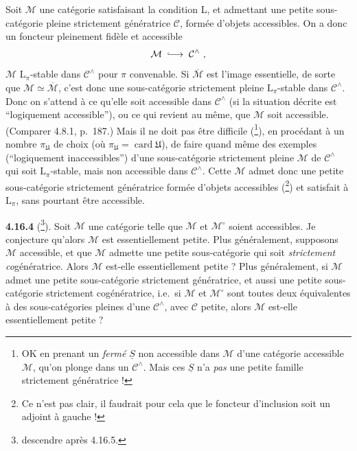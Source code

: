 \documentclass[11pt]{article}
\newcommand{\msp}[1]{\marginpar{\footnotesize [#1]}}
\newcommand{\card}{\operatorname{card}}
\newcommand{\into}{\lhook\joinrel\longrightarrow}
\begin{document}
Soit $\mathcal{M}$ une catégorie satisfaisant la condition L, et admettant une petite sous-catégorie pleine strictement génératrice $\mathcal{C}$, formée d'objets accessibles. On a donc un foncteur pleinement fidèle et accessible
\[
\mathcal{M} \;\into\; \mathcal{C}^\wedge\ ,
\]
$\mathcal{M}$ $\mathrm{L}_\pi$-stable dans $\mathcal{C}^\wedge$ pour $\pi$ convenable. Si $\overline{\mathcal{M}}$ est l'image essentielle, de sorte que $\mathcal{M} \simeq \overline{\mathcal{M}}$, c'est donc une sous-catégorie strictement pleine $\mathrm{L}_\pi$-stable dans $\mathcal{C}^\wedge$. Donc on s'attend à ce qu'elle soit accessible dans $\mathcal{C}^\wedge$ (si la situation décrite est “logiquement accessible”), ou ce qui revient au même, que $\mathcal{M}$ soit accessible. (Comparer 4.8.1, p.~187.) Mais il ne doit pas être difficile (\footnote[192]{OK en prenant un \textit{fermé} $\underline{S}$ non accessible dans $\mathcal{M}$ d'une catégorie accessible $\mathcal{M}$, qu'on plonge dans un $\mathcal{C}^\wedge$. Mais ces $\underline{S}$ n'a \textit{pas} une petite famille strictement génératrice ! %
}), en procédant à un nombre $\pi_{\mathfrak{U}}$ de choix (où $\pi_{\mathfrak{U}} = \card\mathfrak{U}$), de faire quand même des exemples (“logiquement inaccessibles”) d'une sous-catégorie strictement pleine $\mathcal{M}$ de $\mathcal{C}^\wedge$ qui soit $\mathrm{L}_\pi$-stable, mais non accessible dans $\mathcal{C}^\wedge$. Cette $\mathcal{M}$ admet donc une petite sous-catégorie strictement génératrice formée d'objets accessibles (\footnote[193]{Ce n'est pas clair, il faudrait pour cela que le foncteur d'inclusion soit un adjoint à gauche !}) et satisfait à $\mathrm{L}_\pi$, sans pourtant être accessible.

\msp{472}

\textbf{4.16.4} (\footnote[194]{descendre après 4.16.5.}). Soit $\mathcal{M}$ une catégorie telle que $\mathcal{M}$ et $\mathcal{M}^\circ$ soient accessibles. Je conjecture qu'alors $\mathcal{M}$ est essentiellement petite. Plus généralement, supposons $\mathcal{M}$ accessible, et que $\mathcal{M}$ admette une petite sous-catégorie qui soit \textit{strictement co}génératrice. Alors $\mathcal{M}$ est-elle essentiellement petite ? Plus généralement, si $\mathcal{M}$ admet une petite sous-catégorie strictement génératrice, et aussi une petite sous-catégorie strictement cogénératrice, i.e.\ si $\mathcal{M}$ et $\mathcal{M}^\circ$ sont toutes deux équivalentes à des sous-catégories pleines d'une $\mathcal{C}^\wedge$, avec $\mathcal{C}$ petite, alors $\mathcal{M}$ est-elle essentiellement petite ?
\end{document}
